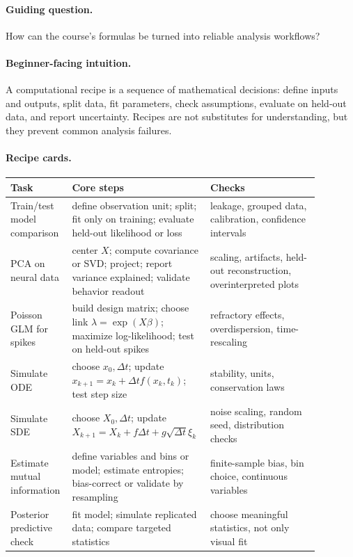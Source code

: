 \paragraph{Guiding question.}
How can the course's formulas be turned into reliable analysis workflows?

\paragraph{Beginner-facing intuition.}
A computational recipe is a sequence of mathematical decisions: define inputs and outputs, split data, fit parameters, check assumptions, evaluate on held-out data, and report uncertainty. Recipes are not substitutes for understanding, but they prevent common analysis failures.

\paragraph{Recipe cards.}
\begin{center}
\small
\setlength{\tabcolsep}{2pt}
\renewcommand{\arraystretch}{1.12}
\begin{tabular}{p{0.19\linewidth}p{0.35\linewidth}p{0.34\linewidth}}
\toprule
Task & Core steps & Checks \\
\midrule
Train/test model comparison & define observation unit; split; fit only on training; evaluate held-out likelihood or loss & leakage, grouped data, calibration, confidence intervals \\
PCA on neural data & center \(X\); compute covariance or SVD; project; report variance explained; validate behavior readout & scaling, artifacts, held-out reconstruction, overinterpreted plots \\
Poisson GLM for spikes & build design matrix; choose link \(\lambda=\exp(X\beta)\); maximize log-likelihood; test on held-out spikes & refractory effects, overdispersion, time-rescaling \\
Simulate ODE & choose \(x_0,\Delta t\); update \(x_{k+1}=x_k+\Delta t f(x_k,t_k)\); test step size & stability, units, conservation laws \\
Simulate SDE & choose \(X_0,\Delta t\); update \(X_{k+1}=X_k+f\Delta t+g\sqrt{\Delta t}\xi_k\) & noise scaling, random seed, distribution checks \\
Estimate mutual information & define variables and bins or model; estimate entropies; bias-correct or validate by resampling & finite-sample bias, bin choice, continuous variables \\
Posterior predictive check & fit model; simulate replicated data; compare targeted statistics & choose meaningful statistics, not only visual fit \\
\bottomrule
\end{tabular}
\end{center}

